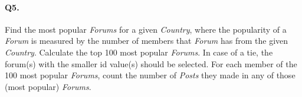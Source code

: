 \paragraph{Q5.}
Find the most popular \emph{Forums} for a given \emph{Country}, where
the popularity of a \emph{Forum} is measured by the number of members
that \emph{Forum} has from the given \emph{Country}.
Calculate the top 100 most popular \emph{Forums}. In case of a tie, the
forum(s) with the smaller id value(s) should be selected.
For each member of the 100 most popular \emph{Forums}, count the number
of \emph{Posts} they made in any of those (most popular) \emph{Forums}.
